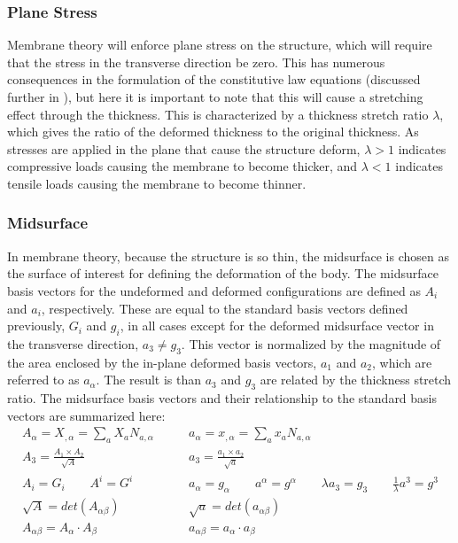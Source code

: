 \documentclass[]{spie}  %
\begin{document}
\subsubsection{Plane Stress}
Membrane theory will enforce plane stress on the structure, which will require that the stress in the transverse direction be zero. This has numerous consequences in the formulation of the constitutive law equations (discussed further in \textit{}), but here it is important to note that this will cause a stretching effect through the thickness. This is characterized by a thickness stretch ratio $\lambda$, which gives the ratio of the deformed thickness to the original thickness. As stresses are applied in the plane that cause the structure deform, $\lambda > 1$ indicates compressive loads causing the membrane to become thicker, and $\lambda <1$ indicates tensile loads causing the membrane to become thinner.

\subsubsection{Midsurface}
In membrane theory, because the structure is so thin, the midsurface is chosen as the surface of interest for defining the deformation of the body. The midsurface basis vectors for the undeformed and deformed configurations are defined as $A_i$ and $a_i$, respectively. These are equal to the standard basis vectors defined previously, $G_i$ and $g_i$, in all cases except for the deformed midsurface vector in the transverse direction, $a_3 \neq g_3$. This vector is normalized by the magnitude of the area enclosed by the in-plane deformed basis vectors, $a_1$ and $a_2$, which are referred to as $a_\alpha$. The result is than $a_3$ and $g_3$ are related by the thickness stretch ratio. The midsurface basis vectors and their relationship to the standard basis vectors are summarized here:
\begin{align}
A_\alpha = X_{,\alpha} = \sum\limits_{a} X_a N_{a,\alpha} \qquad & a_\alpha = x_{,\alpha} = \sum\limits_{a} x_a N_{a,\alpha}\nonumber \\
A_3 = \frac{A_1 \times A_2}{\sqrt{A}} \qquad & a_3 = \frac{a_1 \times a_2}{\sqrt{a}} \nonumber \\
A_i = G_i \qquad A^i = G^i \qquad & a_\alpha = g_\alpha  \qquad a^\alpha = g^\alpha \qquad \lambda a_3 = g_3 \qquad \frac{1}{\lambda}a^3 = g^3 \nonumber \\
\sqrt{A} = det(A_{\alpha\beta}) \qquad & \sqrt{a} = det(a_{\alpha\beta}) \nonumber \\
A_{\alpha\beta} = A_\alpha \cdot A_\beta \qquad & a_{\alpha\beta} = a_\alpha \cdot a_\beta 
\end{align}
\end{document}
